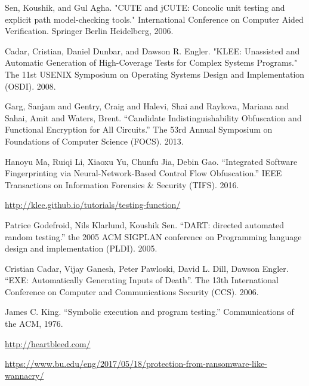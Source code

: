 \documentclass[lnicst]{svmultln}
\begin{document}
\begin{thebibliography}{5}
 Sen, Koushik, and Gul Agha. "CUTE and jCUTE: Concolic unit testing and explicit path model-checking tools." International Conference on Computer Aided Verification. Springer Berlin Heidelberg, 2006.

 Cadar, Cristian, Daniel Dunbar, and Dawson R. Engler. "KLEE: Unassisted and Automatic Generation of High-Coverage Tests for Complex Systems Programs." The 11st USENIX Symposium on Operating Systems Design and Implementation (OSDI). 2008.

 Garg, Sanjam and Gentry, Craig and Halevi, Shai and Raykova, Mariana and Sahai, Amit and Waters, Brent. ``Candidate Indistinguishability Obfuscation and Functional Encryption for All Circuits.'' The 53rd Annual Symposium on Foundations of Computer Science (FOCS). 2013.

 Hanoyu Ma, Ruiqi Li, Xiaoxu Yu, Chunfu Jia, Debin Gao. ``Integrated Software Fingerprinting via Neural-Network-Based Control Flow Obfuscation.'' IEEE Transactions on Information Forensics \& Security (TIFS). 2016.

 \url{http://klee.github.io/tutorials/testing-function/}

 	Patrice Godefroid, 	Nils Klarlund, 	Koushik Sen. ``DART: directed automated random testing.'' the 2005 ACM SIGPLAN conference on Programming language design and implementation (PLDI). 2005.

 Cristian Cadar, Vijay Ganesh, Peter Pawloski, David L. Dill, Dawson Engler. ``EXE: Automatically Generating Inputs of Death''. The 13th International Conference on Computer and Communications Security (CCS). 2006.

 	James C. King. ``Symbolic execution and program testing.'' Communications of the ACM, 1976.

 \url{http://heartbleed.com/}

 \url{https://www.bu.edu/eng/2017/05/18/protection-from-ransomware-like-wannacry/}

\end{thebibliography}
%
\end{document}
